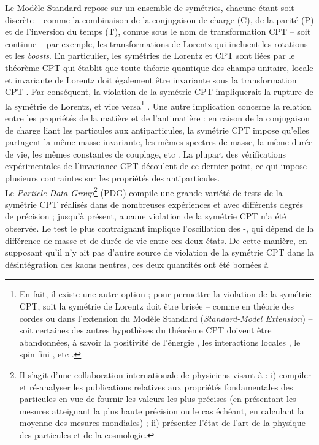 Le Modèle Standard repose sur un ensemble de symétries, chacune étant soit discrète -- comme la combinaison de la conjugaison de charge (C), de la parité (P) et de l'inversion du temps (T), connue sous le nom de transformation CPT -- soit continue -- par exemple, les transformations de Lorentz qui incluent les rotations et les \textit{boosts}. En particulier, les symétries de Lorentz et CPT sont liées par le théorème CPT qui établit que toute théorie quantique des champs unitaire, locale et invariante de Lorentz doit également être invariante sous la transformation CPT \cite{kosteleckyStatusCPT1998}. Par conséquent, la violation de la symétrie CPT impliquerait la rupture de la symétrie de Lorentz, et vice versa\footnote{En fait, il existe une autre option ; pour permettre la violation de la symétrie CPT, soit la symétrie de Lorentz doit être brisée -- comme en théorie des cordes \cite{kosteleckySpontaneousBreakingLorentz1989} ou dans l'extension du Modèle Standard (\textit{Standard-Model Extension}) \cite{colladayLorentzviolatingExtensionStandard1998} -- soit certaines des autres hypothèses du théorème CPT doivent être abandonnées, à savoir la positivité de l'énergie \cite{abersDiseasesInfiniteComponentField1967}, les interactions locales \cite{carruthersIsospinSymmetryTCP1968}, le spin fini \cite{oksakInvalidityTCPtheoremInfinitecomponent1968}, etc \cite{lehnertCPTSymmetryIts2016, greenbergCPTViolationImplies2002}.} \cite{sozziTestsDiscreteSymmetries2019}. Une autre implication concerne la relation entre les propriétés de la matière et de l'antimatière : en raison de la conjugaison de charge liant les particules aux antiparticules, la symétrie CPT impose qu'elles partagent la même masse invariante, les mêmes spectres de masse, la même durée de vie, les mêmes constantes de couplage, etc \cite{lehnertCPTSymmetryIts2016}. La plupart des vérifications expérimentales de l'invariance CPT découlent de ce dernier point, ce qui impose plusieurs contraintes sur les propriétés des antiparticules.\\

Le \textit{Particle Data Group}\footnote{Il s'agit d'une collaboration internationale de physiciens visant à : i) compiler et ré-analyser les publications relatives aux propriétés fondamentales des particules en vue de fournir les valeurs les plus précises (en présentant les mesures atteignant la plus haute précision ou le cas échéant, en calculant la moyenne des mesures mondiales) ; ii) présenter l'état de l'art de la physique des particules et de la cosmologie.} (PDG) \cite{particledatagroupReviewParticlePhysics2022} compile une grande variété de tests de la symétrie CPT réalisés dans de nombreuses expériences et avec différents degrés de précision ; jusqu'à présent, aucune violation de la symétrie CPT n'a été observée. Le test le plus contraignant implique l'oscillation des \rmKzero-\rmAKzero, qui dépend de la différence de masse et de durée de vie entre ces deux états. De cette manière, en supposant qu'il n'y ait pas d'autre source de violation de la symétrie CPT dans la désintégration des kaons neutres, ces deux quantités ont été bornées \cite{particledatagroupReviewParticlePhysics2022, angelopoulosK0OverlineK1999} à

